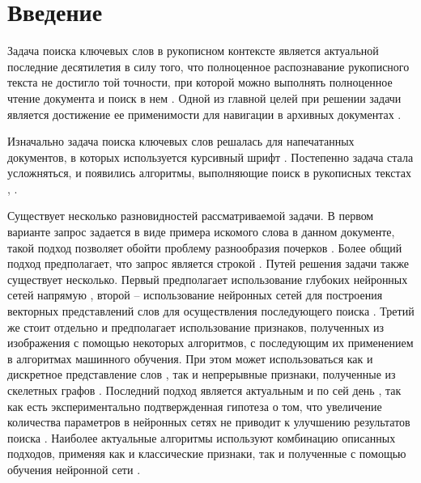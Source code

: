 \documentclass{article}
\begin{document}
\section{Введение}
\par Задача поиска ключевых слов в рукописном контексте является актуальной последние десятилетия в силу того, что полноценное распознавание рукописного текста не достигло той точности, при которой можно выполнять полноценное чтение документа и поиск в нем \citep{10.1007/978-3-031-36616-1_15, SOUIBGUI202243}. Одной из главной целей при решении задачи является достижение ее применимости для навигации в архивных документах \citep{10.1007/978-3-319-13695-0_74, 7333824}. 
\par Изначально задача поиска ключевых слов решалась для напечатанных документов, в которых используется курсивный шрифт \citep{627095}. Постепенно задача стала усложняться, и появились алгоритмы, выполняющие поиск в рукописных текстах \citep{1211511}, .
\par Существует несколько разновидностей рассматриваемой задачи. В первом варианте запрос задается в виде примера искомого слова в данном документе, такой подход позволяет обойти проблему разнообразия почерков \citep{7333824, 8378004}. Более общий подход предполагает, что запрос является строкой \citep{retsinas2021from}. Путей решения задачи также существует несколько. Первый предполагает использование глубоких нейронных сетей напрямую \citep{10.1007/978-3-031-41676-7_26, 10.1007/978-3-031-06555-2_26, Cascianelli2022}, второй -- использование нейронных сетей для построения векторных представлений слов для осуществления последующего поиска \citep{retsinas2021from, Krishnan2023, jemni2023stkeys}. Третий же стоит отдельно и предполагает использование признаков, полученных из изображения с помощью некоторых алгоритмов, с последующим их применением в алгоритмах машинного обучения. При этом может использоваться как и дискретное представление слов \citep{8270021, yousfi2021keyword, kundu2021hough}, так и непрерывные признаки, полученные из скелетных графов \citep{7333824, ameri2017keyword, stauffer2016graph}. Последний подход является актуальным и по сей день \citep{yousfi2021keyword, kundu2021hough, banerjee2022z}, так как есть экспериментально подтвержденная гипотеза о том, что увеличение количества параметров в нейронных сетях не приводит к улучшению результатов поиска \citep{rusakov2018expolring}. Наиболее актуальные алгоритмы используют комбинацию описанных подходов, применяя как и классические признаки, так и полученные с помощью обучения нейронной сети \citep{jemni2023stkeys, omayio2023word}.
\end{document}
